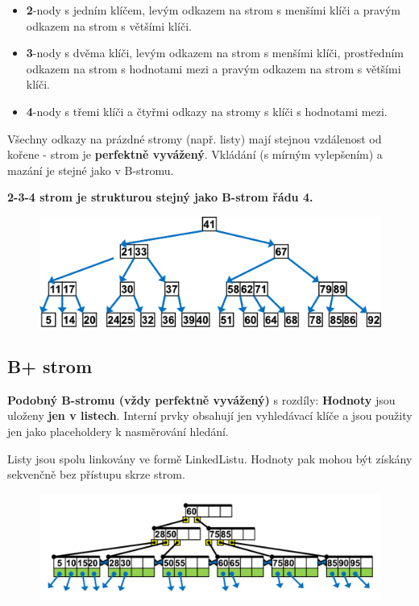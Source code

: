 \begin{itemize}
\item \textbf{2}-nody s jedním klíčem, levým odkazem na strom s menšími klíči a pravým odkazem na strom s většími klíči.
\item \textbf{3}-nody s dvěma klíči, levým odkazem na strom s menšími klíči, prostředním odkazem na strom s hodnotami mezi a pravým odkazem na strom s většími klíči.
\item \textbf{4}-nody s třemi klíči a čtyřmi odkazy na stromy s klíči s hodnotami mezi.
\end{itemize}

Všechny odkazy na prázdné stromy (např. listy) mají stejnou vzdálenost od kořene - strom je \textbf{perfektně vyvážený}. Vkládání (s mírným vylepšením) a mazání je stejné jako v B-stromu.

\textbf{2-3-4 strom je strukturou stejný jako B-strom řádu 4.}

\begin{figure}[h]
    \begin{center}
        \includegraphics[width=130mm]{spolecne/03/images/234tree}
    \end{center}
\end{figure}

\subsection{B+ strom}
\textbf{Podobný B-stromu (vždy perfektně vyvážený)} s rozdíly: \textbf{Hodnoty} jsou uloženy \textbf{jen v listech}. Interní prvky obsahují jen vyhledávací klíče a jsou použity jen jako placeholdery k nasměrování hledání.

Listy jsou spolu linkovány ve formě LinkedListu. Hodnoty pak mohou být získány sekvenčně bez přístupu skrze strom.

\begin{figure}[h]
    \begin{center}
        \includegraphics[width=130mm]{spolecne/03/images/bplustree}
    \end{center}
\end{figure}

